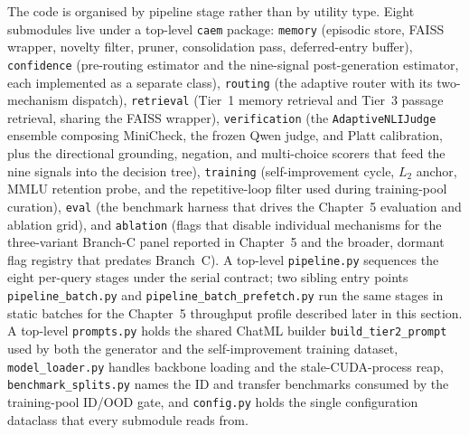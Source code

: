 The code is organised by pipeline stage rather than by utility type. Eight submodules live under a top-level \texttt{caem} package: \texttt{memory} (episodic store, FAISS wrapper, novelty filter, pruner, consolidation pass, deferred-entry buffer), \texttt{confidence} (pre-routing estimator and the nine-signal post-generation estimator, each implemented as a separate class), \texttt{routing} (the adaptive router with its two-mechanism dispatch), \texttt{retrieval} (Tier~1 memory retrieval and Tier~3 passage retrieval, sharing the FAISS wrapper), \texttt{verification} (the \texttt{AdaptiveNLIJudge} ensemble composing MiniCheck, the frozen Qwen judge, and Platt calibration, plus the directional grounding, negation, and multi-choice scorers that feed the nine signals into the decision tree), \texttt{training} (self-improvement cycle, $L_{2}$ anchor, MMLU retention probe, and the repetitive-loop filter used during training-pool curation), \texttt{eval} (the benchmark harness that drives the Chapter~5 evaluation and ablation grid), and \texttt{ablation} (flags that disable individual mechanisms for the three-variant Branch-C panel reported in Chapter~5 and the broader, dormant flag registry that predates Branch~C). A top-level \texttt{pipeline.py} sequences the eight per-query stages under the serial contract; two sibling entry points \texttt{pipeline\_batch.py} and \texttt{pipeline\_batch\_prefetch.py} run the same stages in static batches for the Chapter~5 throughput profile described later in this section. A top-level \texttt{prompts.py} holds the shared ChatML builder \texttt{build\_tier2\_prompt} used by both the generator and the self-improvement training dataset, \texttt{model\_loader.py} handles backbone loading and the stale-CUDA-process reap, \texttt{benchmark\_splits.py} names the ID and transfer benchmarks consumed by the training-pool ID/OOD gate, and \texttt{config.py} holds the single configuration dataclass that every submodule reads from.

